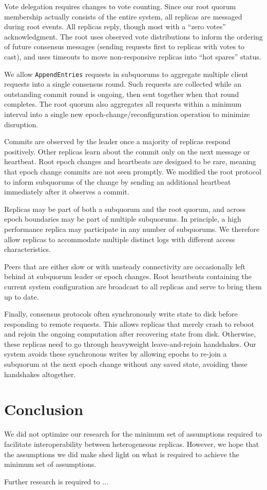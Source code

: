 Vote delegation requires changes to vote counting.
Since our root quorum membership actually consists of the entire system, all replicas
are messaged during root events.
All replicas reply, though most with a ``zero votes'' acknowledgment.
The root uses observed vote distributions to inform the ordering of future
consensus messages (sending requests first to replicas with votes to cast),
and uses timeouts to move non-responsive replicas into ``hot spares'' status.

We allow \texttt{AppendEntries} requests in subquorums to aggregate multiple client
requests into a single consensus round.
Such requests are collected while an outstanding commit round is ongoing, then
sent together when that round completes.
The root quorum also aggregates all requests within a minimum interval into a single
new epoch-change/reconfiguration operation to minimize disruption.

Commits are observed by the leader once a majority of replicas respond
positively.
Other replicas learn about the commit only on the next message or heartbeat.
Root epoch changes and heartbeats are designed to be rare, meaning that epoch
change commits are not seen promptly.
We modified the root protocol to inform subquorums of the change by sending an
additional heartbeat immediately after it observes a commit.

Replicas may be part of both a subquorum and the root quorum, and across epoch boundaries
may be part of multiple subquorums.
In principle, a high performance replica may participate in any number of
subquorums.
We therefore allow replicas to accommodate multiple distinct logs with
different access characteristics.

Peers that are either slow or with unsteady connectivity are occasionally left
behind at subquorum leader or epoch changes.
Root heartbeats containing the current system configuration are broadcast to
all replicas and serve to bring them up to date.

Finally, consensus protocols often synchronously write state to disk before
responding to remote requests.
This allows replicas that merely crash to reboot and rejoin the ongoing
computation after recovering state from disk.
Otherwise, these replicas need to go through heavyweight leave-and-rejoin
handshakes.
Our system avoids these synchronous writes by allowing epochs to re-join a
subquorum at the next epoch change without any saved state, avoiding these
handshakes altogether.

\section{Conclusion}

We did not optimize our research for the minimum set of assumptions required to facilitate interoperability between heterogeneous replicas.
However, we hope that the assumptions we did make shed light on what is required to achieve the minimum set of assumptions.

Further research is required to ...
